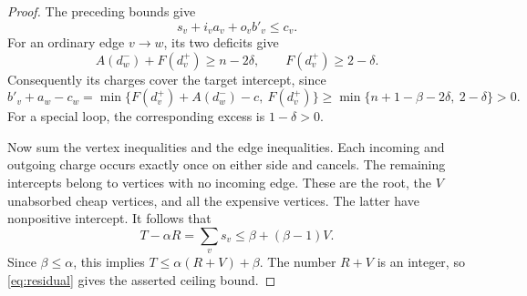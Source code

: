 \begin{proof}
The preceding bounds give
\[
 s_v+i_va_v+o_vb'_v\le c_v.
\]
For an ordinary edge $v\to w$, its two deficits give
\[
 A(d_w^-)+F(d_v^+)\ge n-2\delta,\qquad
 F(d_v^+)\ge2-\delta.
\]
Consequently its charges cover the target intercept, since
\[
 b'_v+a_w-c_w
 =\min\{F(d_v^+)+A(d_w^-)-c,\ F(d_v^+)\}
 \ge\min\{n+1-\beta-2\delta,\ 2-\delta\}>0.
\]
For a special loop, the corresponding excess is $1-\delta>0$.

Now sum the vertex inequalities and the edge inequalities. Each incoming
and outgoing charge occurs exactly once on either side and cancels.
The remaining intercepts belong to vertices with no incoming edge.
These are the root, the $V$ unabsorbed cheap vertices, and all the
expensive vertices. The latter have nonpositive intercept. It follows that
\[
 T-\alpha R=\sum_v s_v\le\beta+(\beta-1)V.
\]
Since $\beta\le\alpha$, this implies
$T\le\alpha(R+V)+\beta$. The number $R+V$ is an integer, so
\eqref{eq:residual} gives the asserted ceiling bound.
\end{proof}
